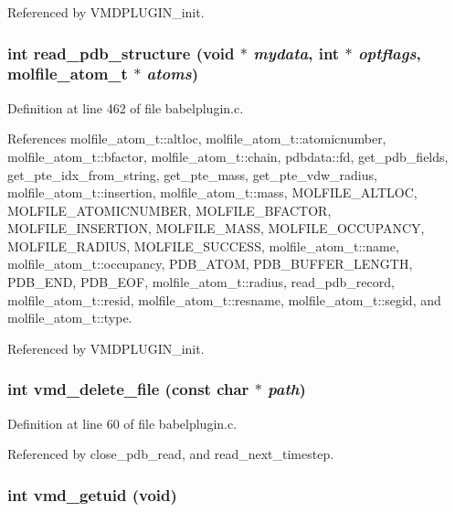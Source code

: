 Referenced by VMDPLUGIN\_\-init.
\subsubsection{\setlength{\rightskip}{0pt plus 5cm}int read\_\-pdb\_\-structure (void $\ast$ {\em mydata}, int $\ast$ {\em optflags}, {\bf molfile\_\-atom\_\-t} $\ast$ {\em atoms})\hspace{0.3cm}{\tt  [static]}}\label{babelplugin_8c_a15}




Definition at line 462 of file babelplugin.c.

References molfile\_\-atom\_\-t::altloc, molfile\_\-atom\_\-t::atomicnumber, molfile\_\-atom\_\-t::bfactor, molfile\_\-atom\_\-t::chain, pdbdata::fd, get\_\-pdb\_\-fields, get\_\-pte\_\-idx\_\-from\_\-string, get\_\-pte\_\-mass, get\_\-pte\_\-vdw\_\-radius, molfile\_\-atom\_\-t::insertion, molfile\_\-atom\_\-t::mass, MOLFILE\_\-ALTLOC, MOLFILE\_\-ATOMICNUMBER, MOLFILE\_\-BFACTOR, MOLFILE\_\-INSERTION, MOLFILE\_\-MASS, MOLFILE\_\-OCCUPANCY, MOLFILE\_\-RADIUS, MOLFILE\_\-SUCCESS, molfile\_\-atom\_\-t::name, molfile\_\-atom\_\-t::occupancy, PDB\_\-ATOM, PDB\_\-BUFFER\_\-LENGTH, PDB\_\-END, PDB\_\-EOF, molfile\_\-atom\_\-t::radius, read\_\-pdb\_\-record, molfile\_\-atom\_\-t::resid, molfile\_\-atom\_\-t::resname, molfile\_\-atom\_\-t::segid, and molfile\_\-atom\_\-t::type.

Referenced by VMDPLUGIN\_\-init.
\subsubsection{\setlength{\rightskip}{0pt plus 5cm}int vmd\_\-delete\_\-file (const char $\ast$ {\em path})\hspace{0.3cm}{\tt  [static]}}\label{babelplugin_8c_a8}




Definition at line 60 of file babelplugin.c.

Referenced by close\_\-pdb\_\-read, and read\_\-next\_\-timestep.
\subsubsection{\setlength{\rightskip}{0pt plus 5cm}int vmd\_\-getuid (void)\hspace{0.3cm}{\tt  [static]}}\label{babelplugin_8c_a7}




